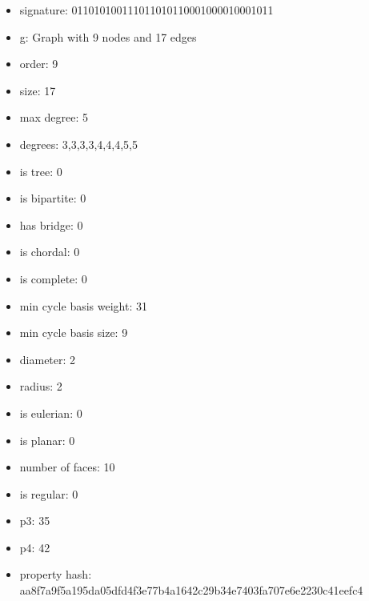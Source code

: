 \newpage
\begin{figure}
\end{figure}
\begin{itemize}
\item signature: 011010100111011010110001000010001011
\item g: Graph with 9 nodes and 17 edges
\item order: 9
\item size: 17
\item max degree: 5
\item degrees: 3,3,3,3,4,4,4,5,5
\item is tree: 0
\item is bipartite: 0
\item has bridge: 0
\item is chordal: 0
\item is complete: 0
\item min cycle basis weight: 31
\item min cycle basis size: 9
\item diameter: 2
\item radius: 2
\item is eulerian: 0
\item is planar: 0
\item number of faces: 10
\item is regular: 0
\item p3: 35
\item p4: 42
\item property hash: aa8f7a9f5a195da05dfd4f3e77b4a1642c29b34e7403fa707e6e2230c41eefc4
\end{itemize}
